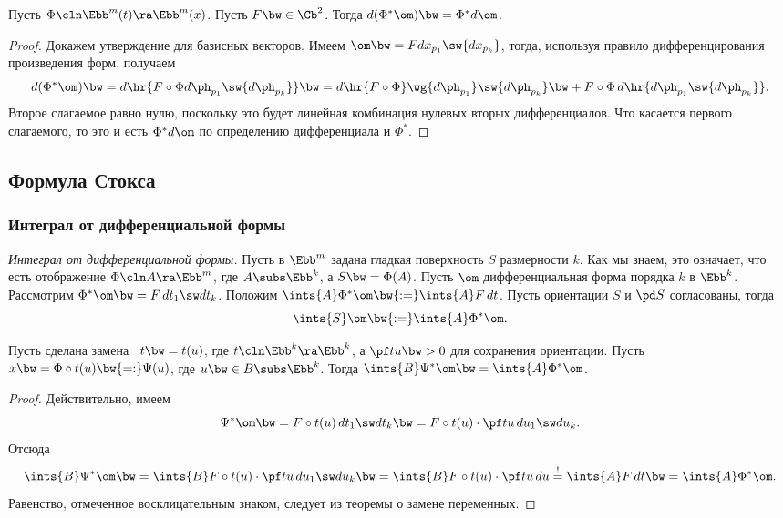 \documentclass[a4paper]{article}
\newcommand{\di}[3]{{d {#1}_{#2_{#3}}}}
\begin{document}
\begin{theorem}
Пусть $\Phi\cln \Ebb^m(t) \ra \Ebb^m(x)$. Пусть $F \bw\in \Cb^2$. Тогда $d(\Phi^*\om) \bw= \Phi^*d \om$.
\end{theorem}
\begin{proof}
Докажем утверждение для базисных векторов. Имеем $\om \bw= F\di xp1 \sw \di xpk$, тогда, используя правило дифференцирования
произведения форм, получаем
$$
  d(\Phi^*\om) \bw= d\hr{F \circ \Phi \di\ph p1\sw \di\ph pk} \bw=
  d\hr{F\circ \Phi} \wg \di\ph p1\sw \di\ph pk \bw+
  F\circ\Phi\,d\hr{\di\ph p1\sw \di\ph pk}.
$$
Второе слагаемое равно нулю, поскольку это будет линейная комбинация нулевых вторых
дифференциалов. Что касается первого слагаемого, то это и есть $\Phi^*d\om$ по определению дифференциала и
$\Phi^*$.
\end{proof}

\subsection{Формула Стокса}

\subsubsection{Интеграл от дифференциальной формы}

\begin{df}
\emph{Интеграл от дифференциальной формы.} Пусть в $\Ebb^m$ задана гладкая поверхность $S$ размерности $k$.
Как мы знаем, это означает, что есть отображение $\Phi\cln A \ra \Ebb^m$, где $A \subs \Ebb^k$, а $S \bw=
\Phi(A)$. Пусть $\om$ дифференциальная форма порядка $k$ в $\Ebb^k$. Рассмотрим $\Phi^*\om \bw= F\,d t_1\sw
d t_k$. Положим $\ints{A}\Phi^*\om \bw{:=} \ints{A}F\,d t$. Пусть ориентации $S$ и $\pd S$ согласованы,
тогда
$$\ints{S} \om \bw{:=} \ints{A} \Phi^*\om.$$
\end{df}

\begin{theorem}
Пусть сделана замена \ $t \bw= t(u)$, где $t\cln \Ebb^k \ra \Ebb^k$, а $\pf tu \bw> 0$ для
сохранения ориентации. Пусть $x \bw= \Phi\circ t(u) \bw{=:} \Psi(u)$, где $u \bw\in B \subs \Ebb^k$.
Тогда $\ints{B} \Psi^* \om \bw= \ints{A} \Phi^*\om$.
\end{theorem}
\begin{proof}
Действительно, имеем
$$\Psi^*\om \bw= F\circ t(u) \,d t_1\sw d t_k \bw= F\circ t(u) \cdot \pf tu \,d u_1\sw d u_k.$$
Отсюда
$$\ints{B}\Psi^*\om \bw= \ints{B}F\circ t (u) \cdot \pf tu \,d u_1\sw d u_k \bw=
\ints{B}F\circ t(u) \cdot \pf tu \,d u \stackrel{!}{=} \ints{A}F\,d t\bw= \ints{A} \Phi^*\om.$$ Равенство,
отмеченное восклицательным знаком, следует из теоремы о замене переменных.
\end{proof}
\end{document}
